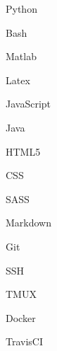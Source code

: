 
    \begin{cvskills}{9}
                {\faCode}   %
                {           %
                    \begin{cvitems}
                        \item {Python}
                        \item {Bash}
                        \item {Matlab}
                        \item {Latex}
                        \item {JavaScript}
                        \item {Java}
                    \end{cvitems}
                }
                {\faMarkdown}   %
                {               %
                    \begin{cvitems}
                        \item {HTML5}
                        \item {CSS}
                        \item {SASS}
                        \item {Markdown}
                    \end{cvitems}
                }
                {\faDocker}     %
                {               %
                    \begin{cvitems}
                        \item {Git}
                        \item {SSH}
                        \item {TMUX}
                        \item {Docker}
                        \item {TravisCI}
                    \end{cvitems}
                }
    \end{cvskills}

